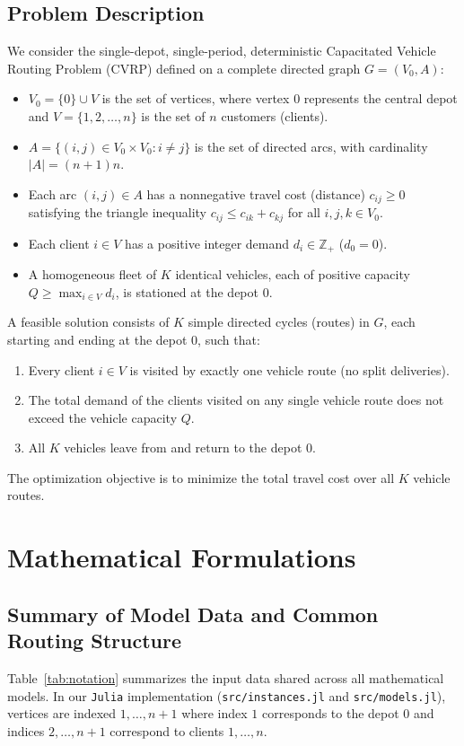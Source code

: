\documentclass[11pt,a4paper]{article}
\begin{document}
\subsection{Problem Description}
We consider the single-depot, single-period, deterministic Capacitated Vehicle Routing Problem (CVRP) defined on a complete directed graph $G = (V_0, A)$:
\begin{itemize}[noitemsep,topsep=3pt]
    \item $V_0 = \{0\} \cup V$ is the set of vertices, where vertex $0$ represents the central depot and $V = \{1, 2, \dots, n\}$ is the set of $n$ customers (clients).
    \item $A = \{(i, j) \in V_0 \times V_0 : i \neq j\}$ is the set of directed arcs, with cardinality $|A| = (n+1)n$.
    \item Each arc $(i, j) \in A$ has a nonnegative travel cost (distance) $c_{ij} \ge 0$ satisfying the triangle inequality $c_{ij} \le c_{ik} + c_{kj}$ for all $i, j, k \in V_0$.
    \item Each client $i \in V$ has a positive integer demand $d_i \in \mathbb{Z}_+$ ($d_0 = 0$).
    \item A homogeneous fleet of $K$ identical vehicles, each of positive capacity $Q \ge \max_{i \in V} d_i$, is stationed at the depot $0$.
\end{itemize}
A feasible solution consists of $K$ simple directed cycles (routes) in $G$, each starting and ending at the depot $0$, such that:
\begin{enumerate}[noitemsep,topsep=3pt]
    \item Every client $i \in V$ is visited by exactly one vehicle route (no split deliveries).
    \item The total demand of the clients visited on any single vehicle route does not exceed the vehicle capacity $Q$.
    \item All $K$ vehicles leave from and return to the depot $0$.
\end{enumerate}
The optimization objective is to minimize the total travel cost over all $K$ vehicle routes.

\section{Mathematical Formulations}

\subsection{Summary of Model Data and Common Routing Structure}
Table~\ref{tab:notation} summarizes the input data shared across all mathematical models. In our \texttt{Julia} implementation (\texttt{src/instances.jl} and \texttt{src/models.jl}), vertices are indexed $1, \dots, n+1$ where index $1$ corresponds to the depot $0$ and indices $2, \dots, n+1$ correspond to clients $1, \dots, n$.
\end{document}
